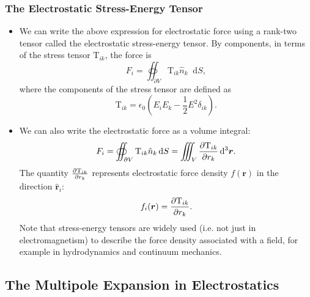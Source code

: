 \documentclass[11pt, a4paper]{article}
\newcommand{\diff}{\mathop{}\!\mathrm{d}} %
\newcommand{\dr}{\diff^{3} \r}  %
\renewcommand{\vec}[1]{\bm{#1}} %
\newcommand{\uvec}[1]{\hat{\vec{#1}}} %
\renewcommand{\r}{\vec{r}}
\newcommand{\TT}{\mathrm{T}}  %
\newcommand{\ee}{\epsilon_{0}}  %
\begin{document}
\subsubsection{The Electrostatic Stress-Energy Tensor}
\begin{itemize}
	\item We can write the above expression for electrostatic force using a rank-two tensor called the electrostatic stress-energy tensor. By components, in terms of the stress tensor $ \TT_{ik} $, the force is
	\begin{equation*}
		F_{i} = \oiint_{\partial V} \TT_{ik} \hat{n}_{k} \diff S,
	\end{equation*}
	where the components of the stress tensor are defined as
	\begin{equation*}
		\TT_{ik} = \ee \left(E_{i}E_{k} - \frac{1}{2}E^{2}\delta_{ik} \right).
	\end{equation*}
	
	\item We can also write the electrostatic force as a volume integral:
	\begin{equation*}
		F_{i} = \oiint_{\partial V} \TT_{ik} \hat{n}_{k} \diff S = \iiint_{V} \pdv{\TT_{ik}}{r_{k}} \dr.
	\end{equation*}
	The quantity $ \pdv{\TT_{ik}}{r_{k}} $ represents electrostatic force density $ f(\r) $ in the direction $ \uvec{r}_{i} $:
	\begin{equation*}
		f_{i}(\r) = \pdv{\TT_{ik}}{r_{k}}.
	\end{equation*}
	Note that stress-energy tensors are widely used (i.e. not just in electromagnetism) to describe the force density associated with a field, for example in hydrodynamics and continuum mechanics.
	
	
\end{itemize}

\subsection{The Multipole Expansion in Electrostatics}
\end{document}
